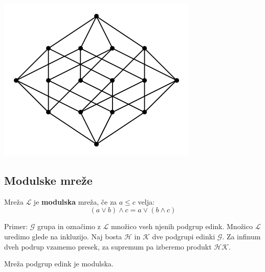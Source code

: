 \documentclass[slovene]{beamer}
\begin{document}
\begin{frame}
\includegraphics[scale=0.29]{bool4}
\end{frame}




\begin{frame}
\section{Modulske mreže}
\begin{definition}
Mreža $\mathcal{L}$ je \textbf{modulska} mreža, če za $a \leq c$ velja:
$$(a \lor b) \land c = a \lor (b \land c)$$
\end{definition}
\end{frame}


\begin{frame}
\begin{block}{}
Primer: $\mathcal{G}$ grupa in označimo z $\mathcal{L}$ množico vseh  njenih podgrup edink. Množico $\mathcal{L}$ uredimo glede na inkluzijo. Naj bosta $\mathcal{H}$  in $\mathcal{K}$ dve podgrupi edinki $\mathcal{G}$. Za infinum dveh podrup vzamemo presek, za supremum pa izberemo produkt $\mathcal{HK}$.
\end{block}
\end{frame}

\begin{frame}
\begin{theorem}
Mreža podgrup edink je modulska.
\end{theorem}
\end{frame}
\end{document}
